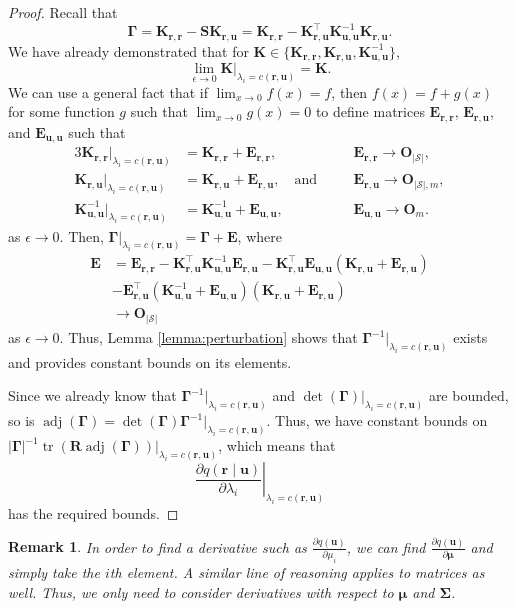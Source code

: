 \documentclass{mpaper}
\newtheorem{remark}[theorem]{Remark}
\DeclareMathOperator{\adj}{adj}
\DeclareMathOperator{\tr}{tr}
\newcommand{\Kuu}{\mathbf{K}_{\mathbf{u},\mathbf{u}}}
\newcommand{\Krr}{\mathbf{K}_{\mathbf{r},\mathbf{r}}}
\newcommand{\Kru}{\mathbf{K}_{\mathbf{r},\mathbf{u}}}
\newcommand{\Euu}{\mathbf{E}_{\mathbf{u},\mathbf{u}}}
\newcommand{\Err}{\mathbf{E}_{\mathbf{r},\mathbf{r}}}
\newcommand{\Eru}{\mathbf{E}_{\mathbf{r},\mathbf{u}}}
\begin{document}
\begin{proof}
  Recall that
  \[
    \bm\Gamma = \Krr - \mathbf{S}\Kru = \Krr - \Kru^\intercal\Kuu^{-1}\Kru.
  \]
  We have already demonstrated that for $\mathbf{K} \in \{ \Krr, \Kru, \Kuu^{-1}
  \}$,
  \[
    \lim_{\epsilon \to 0}\mathbf{K}|_{\lambda_i = c(\mathbf{r}, \mathbf{u})} =
    \mathbf{K}.
  \]
  We can use a general fact that if $\lim_{x \to 0} f(x) = f$,
  then $f(x) = f + g(x)$ for some function $g$ such that $\lim_{x \to 0} g(x) =
  0$ to define matrices $\Err$, $\Eru$, and $\Euu$ such that
  \begin{alignat*}{3}
    \Krr|_{\lambda_i = c(\mathbf{r}, \mathbf{u})} &= \Krr + \Err, &&\Err \to
    \mathbf{O}_{|\mathcal{S}|}, \\
    \Kru|_{\lambda_i = c(\mathbf{r}, \mathbf{u})} &= \Kru + \Eru, \quad
    \text{and} \quad &&\Eru \to \mathbf{O}_{|\mathcal{S}|, m}, \\
    \Kuu^{-1}|_{\lambda_i = c(\mathbf{r}, \mathbf{u})} &= \Kuu^{-1} + \Euu,
    &&\Euu \to \mathbf{O}_{m}.
  \end{alignat*}
  as $\epsilon \to 0$. Then, $\bm\Gamma|_{\lambda_i = c(\mathbf{r}, \mathbf{u})}
  = \bm\Gamma + \mathbf{E}$, where
  \begin{align*}
    \mathbf{E} &= \Err - \Kru^\intercal\Kuu^{-1}\Eru - \Kru^\intercal\Euu(\Kru + \Eru) \\
               &- \Eru^\intercal(\Kuu^{-1} + \Euu)(\Kru + \Eru) \\
               &\to \mathbf{O}_{|\mathcal{S}|}
  \end{align*}
  as $\epsilon \to 0$. Thus, Lemma \ref{lemma:perturbation} shows that
  $\bm\Gamma^{-1}|_{\lambda_i = c(\mathbf{r}, \mathbf{u})}$ exists and provides
  constant bounds on its elements.

  Since we already know that $\bm\Gamma^{-1}|_{\lambda_i = c(\mathbf{r},
    \mathbf{u})}$ and $\det(\bm\Gamma)|_{\lambda_i = c(\mathbf{r}, \mathbf{u})}$
  are bounded, so is $\adj(\bm\Gamma) =
  \det(\bm\Gamma)\bm\Gamma^{-1}|_{\lambda_i = c(\mathbf{r}, \mathbf{u})}$. Thus,
  we have constant bounds on
  $|\bm\Gamma|^{-1}\tr(\mathbf{R}\adj(\bm\Gamma))|_{\lambda_i = c(\mathbf{r},
    \mathbf{u})}$, which means that
  \[
    \left. \frac{\partial q(\mathbf{r} \mid \mathbf{u})}{\partial \lambda_i}
    \right|_{\lambda_i = c(\mathbf{r}, \mathbf{u})}
  \]
  has the required bounds.
\end{proof}

\begin{remark}
  In order to find a derivative such as $\frac{\partial q(\mathbf{u})}{\partial
    \mu_i}$, we can find $\frac{\partial q(\mathbf{u})}{\partial \bm\mu}$ and
  simply take the $i$th element. A similar line of reasoning applies to matrices
  as well. Thus, we only need to consider derivatives with respect to $\bm\mu$
  and $\bm\Sigma$.
\end{remark}
\end{document}
